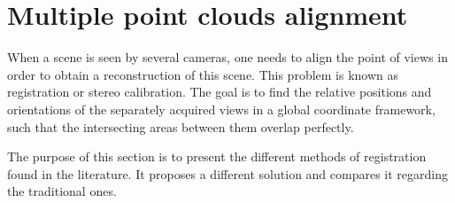\section{Multiple point clouds alignment}
\label{section:Registration}
When a scene is seen by several cameras, one needs to align the point of views in order to obtain a reconstruction of this scene. This problem is known as registration or stereo calibration. The goal is to find the relative positions and orientations of the separately acquired views in a global coordinate framework, such that the intersecting areas between them overlap perfectly.

The purpose of this section is to present the different methods of registration found in the literature. It proposes a different solution and compares it regarding the traditional ones.






